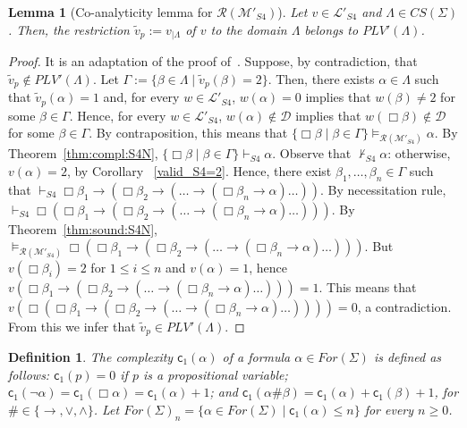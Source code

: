 \documentclass[12pt]{article}
\newtheorem{lemma}[theorem]{Lemma}
\newtheorem{definition}[theorem]{Definition}
\newcommand {\co} {\textsf{c}}
\begin{document}
\begin{lemma} [Co-analyticity lemma for $\mathcal{R}(\mathcal{M}'_{S4})$] \label{co-analyticityS4} Let $v \in \mathcal{L}'_{S4}$ and  $\Lambda \in CS(\Sigma)$. Then, the restriction $\tilde v_p:=v_{|\Lambda}$ of $v$ to the domain $\Lambda$ belongs to $PLV'(\Lambda)$.
\end{lemma}
\begin{proof} It is an adaptation of the proof of~\cite[Lemma~3.13]{gratz_truth_2022}.
Suppose, by contradiction, that $\tilde v_p \notin PLV'(\Lambda)$. 
Let $\Gamma:= \{\beta \in \Lambda \mid \tilde v_p(\beta) =2\}$. Then, there exists $\alpha \in \Lambda$ such that $\tilde v_p(\alpha) = 1$ and, for every $w \in \mathcal{L}'_{S4}$, $w(\alpha)=0$ implies that $w(\beta) \neq 2$ for some $\beta \in \Gamma$. Hence, for every $w \in \mathcal{L}'_{S4}$, $w(\alpha) \not\in \mathcal{D}$ implies that $w(\Box \beta) \notin \mathcal{D}$ for some $\beta \in \Gamma$. By contraposition, this means that $\{\Box \beta \mid \beta \in \Gamma \} \models_{\mathcal{R}(\mathcal{M}'_{S4})} \alpha$.  By Theorem~\ref{thm:compl:S4N},  $\{\Box \beta \mid \beta \in \Gamma \} \vdash_{S4} \alpha$. Observe that $\nvdash_{S4} \alpha$: otherwise, $v(\alpha)=2$, by Corollary~ \ref{valid_S4=2}. Hence, there exist $\beta_1,\ldots, \beta_n \in \Gamma$ such that $\vdash_{S4} \Box\beta_1 \to (\Box\beta_2 \to(\ldots \to(\Box\beta_n \to \alpha) \ldots))$. By necessitation rule,  $\vdash_{S4} \Box(\Box\beta_1 \to (\Box\beta_2 \to(\ldots \to(\Box\beta_n \to \alpha) \ldots)))$. By Theorem~\ref{thm:sound:S4N}, $\models_{\mathcal{R}(\mathcal{M}'_{S4})} \Box(\Box\beta_1 \to (\Box\beta_2 \to(\ldots \to(\Box\beta_n \to \alpha) \ldots)))$. But $v(\Box\beta_i) =2$ for $1 \leq i \leq n$ and $v(\alpha)=1$, hence $v(\Box\beta_1 \to (\Box\beta_2 \to(\ldots \to(\Box\beta_n \to \alpha) \ldots)))=1$. This means that $v(\Box(\Box\beta_1 \to (\Box\beta_2 \to(\ldots \to(\Box\beta_n \to \alpha) \ldots))))=0$, a contradiction. From this we infer that  $\tilde v_p \in PLV'(\Lambda)$. 
\end{proof}


\begin{definition}
The {\em complexity} $\co_1(\alpha)$ of a formula $\alpha \in For(\Sigma)$ is defined as follows:  $\co_1(p)=0$ if $p$ is  a propositional variable; $\co_1(\neg \alpha)=\co_1(\Box \alpha)= \co_1(\alpha)+1$; and $\co_1(\alpha \# \beta)=\co_1(\alpha)+\co_1(\beta)+1$, for $\# \in \{\to,\vee,\land\}$. Let $For(\Sigma)_n=\{\alpha \in For(\Sigma) \mid \co_1(\alpha) \leq n\}$ for every $n \geq 0$.
\end{definition}
\end{document}
